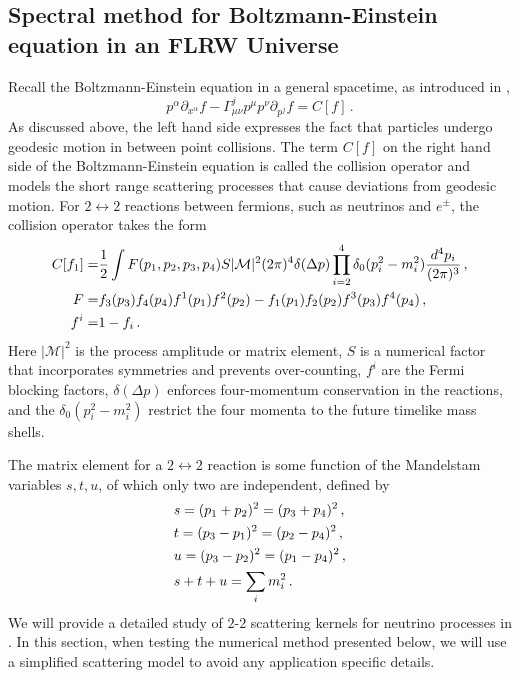 \subsection{Spectral method for Boltzmann-Einstein equation  in an FLRW Universe}\label{sec:theMethod}
Recall the  Boltzmann-Einstein equation in a general spacetime, as introduced in ,
\begin{equation}
p^\alpha\partial_{x^\alpha}f-\Gamma^j_{\mu\nu}p^\mu p^\nu\partial_{p^j}f=C[f]\,.
\end{equation}
As discussed above, the left hand side expresses the fact that particles undergo geodesic motion in between point collisions. The term $C[f]$ on the right hand side of the Boltzmann-Einstein equation is called the collision operator and models the short range scattering processes that cause deviations from geodesic motion. For $2\leftrightarrow 2$ reactions between fermions, such as neutrinos and $e^\pm$, the collision operator takes the form
\begin{align}\label{coll}
C[f_1]=&\frac{1}{2}\int F(p_1,p_2,p_3,p_4) S |\mathcal{M}|^2(2\pi)^4\delta(\Delta p)\prod_{i=2}^4\delta_0(p_i^2-m_i^2)\frac{d^4p_i}{(2\pi)^3}\,,\\
F=&f_3(p_3)f_4(p_4)f^1(p_1)f^2(p_2)-f_1(p_1)f_2(p_2)f^3(p_3)f^4(p_4)\,,\notag\\
f^i=&1- f_i\,.\notag
\end{align}
Here $|\mathcal{M}|^2$ is the process amplitude or matrix element, $S$ is a numerical factor that incorporates symmetries and prevents over-counting, $f^i$ are the Fermi blocking factors, $\delta(\Delta p)$ enforces four-momentum conservation in the reactions, and the $\delta_0(p_i^2-m_i^2)$ restrict the four momenta to the future timelike mass shells.


The matrix element for a $2\leftrightarrow2$ reaction is some function of the Mandelstam variables $s, t, u$, of which only two are independent, defined by
\begin{align}\label{Mandelstam}
&s=(p_1+p_2)^2=(p_3+p_4)^2\,,\\
&t=(p_3-p_1)^2=(p_2-p_4)^2\,,\notag\\
&u=(p_3-p_2)^2=(p_1-p_4)^2\,,\notag\\
&s+t+u=\sum_i m_i^2\,.\notag
\end{align}
We will provide a detailed study of $2$-$2$ scattering kernels for neutrino processes in . In this section, when testing the numerical method presented below, we will use a simplified scattering model to avoid any application specific details.

